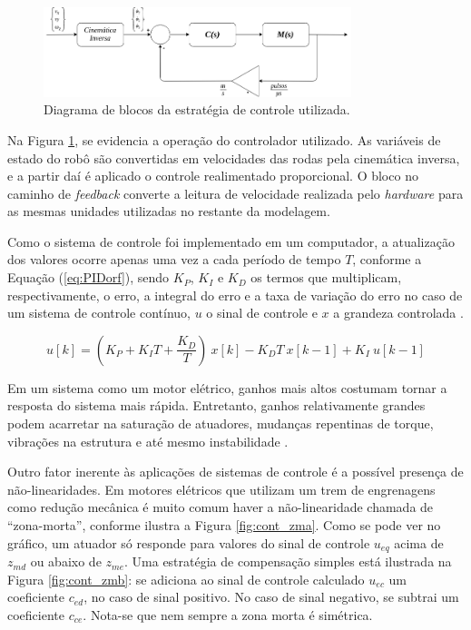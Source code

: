 \begin{figure}[h]
  \centering
  \includegraphics[width = 0.8\textwidth]{imagens/controle}
  \caption{Diagrama de blocos da estratégia de controle utilizada.}
  \label{fig:controle}
\end{figure}

Na Figura \ref{fig:controle}, se evidencia a operação do controlador utilizado. As variáveis de estado do robô são convertidas em velocidades das rodas pela cinemática inversa, e a partir daí é aplicado o controle realimentado proporcional. O bloco no caminho de \textit{feedback} converte a leitura de velocidade realizada pelo \textit{hardware} para as mesmas unidades utilizadas no restante da modelagem.

Como o sistema de controle foi implementado em um computador, a atualização dos valores ocorre apenas uma vez a cada período de tempo $T$, conforme a Equação (\ref{eq:PIDorf}), sendo $K_P$, $K_I$ e $K_D$ os termos que multiplicam, respectivamente, o erro, a integral do erro e a taxa de variação do erro no caso de um sistema de controle contínuo, $u$ o sinal de controle e $x$ a grandeza controlada \citep{dorf2008modern}.

\begin{equation}
  u[k] = (K_P+K_I T+\frac{K_D}{T})\ x[k] - K_D T\ x[k-1] + K_I\ u[k-1]
  \label{eq:PIDorf}
\end{equation}

Em um sistema como um motor elétrico, ganhos mais altos costumam tornar a resposta do sistema mais rápida. Entretanto, ganhos relativamente grandes podem acarretar na saturação de atuadores, mudanças repentinas de torque, vibrações na estrutura e até mesmo instabilidade \citep{lynch2017modern}.

Outro fator inerente às aplicações de sistemas de controle é a possível presença de não-linearidades. Em motores elétricos que utilizam um trem de engrenagens como redução mecânica é muito comum haver a não-linearidade chamada de ``zona-morta'', conforme ilustra a Figura \ref{fig:cont_zma}. Como se pode ver no gráfico, um atuador só responde para valores do sinal de controle $u_{eq}$ acima de $z_{md}$ ou abaixo de $z_{me}$. Uma estratégia de compensação simples está ilustrada na Figura \ref{fig:cont_zmb}: se adiciona ao sinal de controle calculado $u_{ec}$ um coeficiente $c_{ed}$, no caso de sinal positivo. No caso de sinal negativo, se subtrai um coeficiente $c_{ce}$. Nota-se que nem sempre a zona morta é simétrica.

